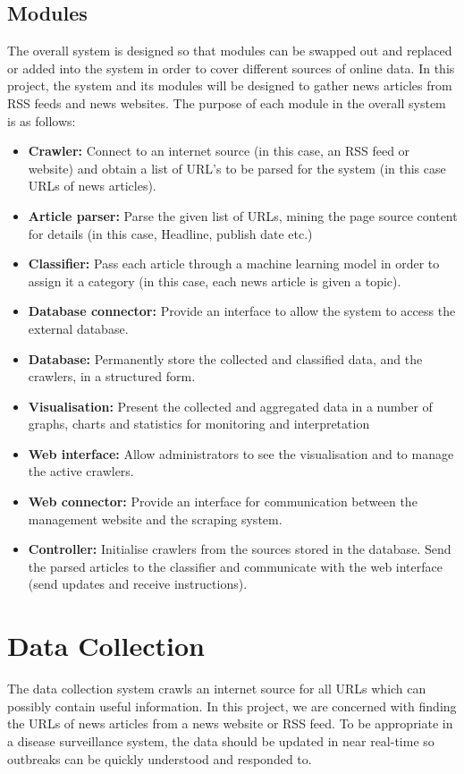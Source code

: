 \documentclass{l4proj}
\begin{document}
\subsection{Modules}
The overall system is designed so that modules can be swapped out and replaced or added into the system in order to cover different sources of online data. In this project, the system and its modules will be designed to gather news articles from RSS feeds and news websites. The purpose of each module in the overall system is as follows:
\begin{itemize}
    \item \textbf{Crawler: } Connect to an internet source (in this case, an RSS feed or website) and obtain a list of URL's to be parsed for the system (in this case URLs of news articles).
    \item \textbf{Article parser: } Parse the given list of URLs, mining the page source content for details (in this case, Headline, publish date etc.)
    \item \textbf{Classifier: } Pass each article through a machine learning model in order to assign it a category (in this case, each news article is given a topic).
    \item \textbf{Database connector: } Provide an interface to allow the system to access the external database.
    \item \textbf{Database: } Permanently store the collected and classified data, and the crawlers, in a structured form.
    \item \textbf{Visualisation: } Present the collected and aggregated data in a number of graphs, charts and statistics for monitoring and interpretation
    \item \textbf{Web interface: } Allow administrators to see the visualisation and to manage the active crawlers.
    \item \textbf{Web connector: } Provide an interface for communication between the management website and the scraping system.
    \item \textbf{Controller: } Initialise crawlers from the sources stored in the database. Send the parsed articles to the classifier and communicate with the web interface (send updates and receive instructions).
\end{itemize}


\section{Data Collection}
The data collection system crawls an internet source for all URLs which can possibly contain useful information. In this project, we are concerned with finding the URLs of news articles from a news website or RSS feed. To be appropriate in a disease surveillance system, the data should be updated in near real-time so outbreaks can be quickly understood and responded to.
\end{document}
